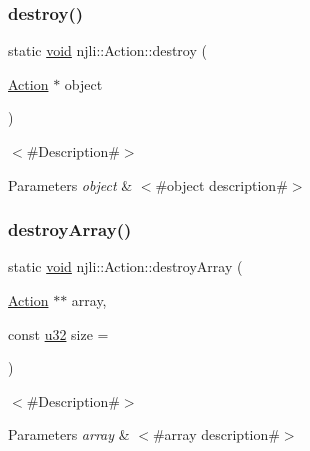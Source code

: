 \mbox{\label{classnjli_1_1_action_a2700b8178a01910f7002e40a9864bd00}} 
\subsubsection{\texorpdfstring{destroy()}{destroy()}}
{\footnotesize\ttfamily static \mbox{\hyperlink{_thread_8h_af1e856da2e658414cb2456cb6f7ebc66}{void}} njli\+::\+Action\+::destroy (\begin{DoxyParamCaption}\item[{\mbox{\hyperlink{classnjli_1_1_action}{Action}} $\ast$}]{object }\end{DoxyParamCaption})\hspace{0.3cm}{\ttfamily [static]}}

$<$\#\+Description\#$>$


\begin{DoxyParams}{Parameters}
{\em object} & $<$\#object description\#$>$ \\
\hline
\end{DoxyParams}
\mbox{\label{classnjli_1_1_action_ad811fdb14878475fc47449b9484bac5d}} 
\subsubsection{\texorpdfstring{destroy\+Array()}{destroyArray()}}
{\footnotesize\ttfamily static \mbox{\hyperlink{_thread_8h_af1e856da2e658414cb2456cb6f7ebc66}{void}} njli\+::\+Action\+::destroy\+Array (\begin{DoxyParamCaption}\item[{\mbox{\hyperlink{classnjli_1_1_action}{Action}} $\ast$$\ast$}]{array,  }\item[{const \mbox{\hyperlink{_util_8h_a10e94b422ef0c20dcdec20d31a1f5049}{u32}}}]{size = {} }\end{DoxyParamCaption})\hspace{0.3cm}{\ttfamily [static]}}

$<$\#\+Description\#$>$


\begin{DoxyParams}{Parameters}
{\em array} & $<$\#array description\#$>$ \\
\hline
\end{DoxyParams}
\mbox{\label{classnjli_1_1_action_af89d90b8b772764145b8efb367958c69}} 
